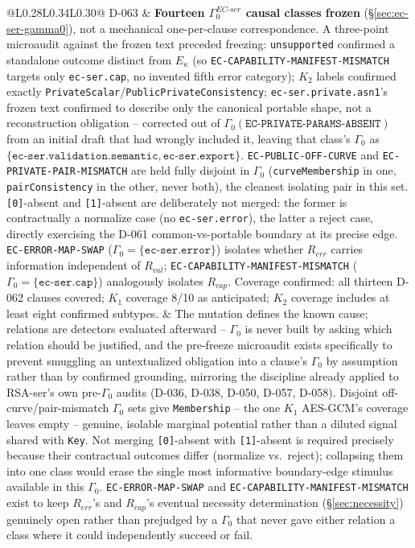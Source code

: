 \documentclass[11pt,a4paper]{article}
\begin{document}
\begin{longtable}{@{}L{0.28\textwidth}L{0.34\textwidth}L{0.30\textwidth}@{}}
D-063 & \textbf{Fourteen $\Gamma_0^{EC\text{-}ser}$ causal classes frozen} (\S\ref{sec:ec-ser-gamma0}), not a mechanical one-per-clause correspondence. A three-point microaudit against the frozen text preceded freezing: \texttt{unsupported} confirmed a standalone outcome distinct from $E_\kappa$ (so \texttt{EC-CAPABILITY-MANIFEST-MISMATCH} targets only \texttt{ec-ser.cap}, no invented fifth error category); $K_2$ labels confirmed exactly \texttt{PrivateScalar}/\texttt{PublicPrivateConsistency}; \texttt{ec-ser.private.asn1}'s frozen text confirmed to describe only the canonical portable shape, not a reconstruction obligation -- corrected out of $\Gamma_0(\texttt{EC-PRIVATE-PARAMS-ABSENT})$ from an initial draft that had wrongly included it, leaving that class's $\Gamma_0$ as $\{\texttt{ec-ser.validation.semantic}, \texttt{ec-ser.export}\}$. \texttt{EC-PUBLIC-OFF-CURVE} and \texttt{EC-PRIVATE-PAIR-MISMATCH} are held fully disjoint in $\Gamma_0$ (\texttt{curveMembership} in one, \texttt{pairConsistency} in the other, never both), the cleanest isolating pair in this set. \texttt{[0]}-absent and \texttt{[1]}-absent are deliberately not merged: the former is contractually a normalize case (no \texttt{ec-ser.error}), the latter a reject case, directly exercising the D-061 common-vs-portable boundary at its precise edge. \texttt{EC-ERROR-MAP-SWAP} ($\Gamma_0=\{\texttt{ec-ser.error}\}$) isolates whether $R_{err}$ carries information independent of $R_{val}$; \texttt{EC-CAPABILITY-MANIFEST-MISMATCH} ($\Gamma_0=\{\texttt{ec-ser.cap}\}$) analogously isolates $R_{cap}$. Coverage confirmed: all thirteen D-062 clauses covered; $K_1$ coverage 8/10 as anticipated; $K_2$ coverage includes at least eight confirmed subtypes. & The mutation defines the known cause; relations are detectors evaluated afterward -- $\Gamma_0$ is never built by asking which relation should be justified, and the pre-freeze microaudit exists specifically to prevent smuggling an untextualized obligation into a clause's $\Gamma_0$ by assumption rather than by confirmed grounding, mirroring the discipline already applied to RSA-ser's own pre-$\Gamma_0$ audits (D-036, D-038, D-050, D-057, D-058). Disjoint off-curve/pair-mismatch $\Gamma_0$ sets give \texttt{Membership} -- the one $K_1$ AES-GCM's coverage leaves empty -- genuine, isolable marginal potential rather than a diluted signal shared with \texttt{Key}. Not merging \texttt{[0]}-absent with \texttt{[1]}-absent is required precisely because their contractual outcomes differ (normalize vs.\ reject); collapsing them into one class would erase the single most informative boundary-edge stimulus available in this $\Gamma_0$. \texttt{EC-ERROR-MAP-SWAP} and \texttt{EC-CAPABILITY-MANIFEST-MISMATCH} exist to keep $R_{err}$'s and $R_{cap}$'s eventual necessity determination (\S\ref{sec:necessity}) genuinely open rather than prejudged by a $\Gamma_0$ that never gave either relation a class where it could independently succeed or fail.\\

\end{longtable}
\end{document}
